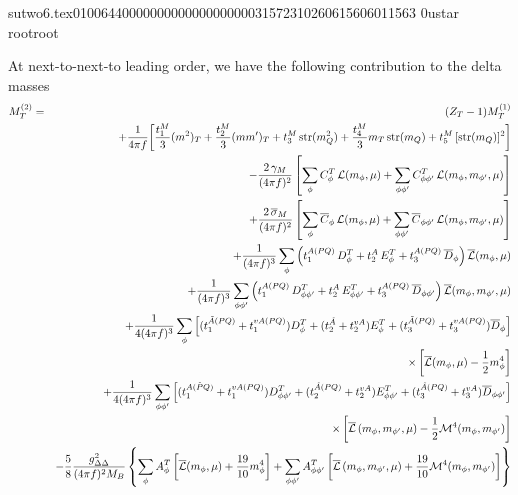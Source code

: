                                                                                                                                                                                                                                                                                       sutwo6.tex                                                                                          0100644 0000000 0000000 00000315723 10260615606 011563  0                                                                                                    ustar   root                            root                                                                                                                                                                                                                   \documentclass[prd,amssymb,amsmath,showpacs,nofootinbib,superscriptaddress]{revtex4}
\begin{document}
At next-to-next-to leading order, we have the following contribution to the delta masses
{\small
\begin{eqnarray}
	M_T^{(2)} &=& (Z_T - 1) M_T^{(1)} \notag\\
	&&	+ \frac{1}{4\pi f} \bigg[ \frac{t_1^M}{3} (m^2)_T 
			+ \frac{t_2^M}{3} (m m')_T 
			+ t_3^M \, \str(m_Q^2) 
			+ \frac{ t_4^M}{3}   m_T  \, \str (m_Q)
			+ t_5^M \, [\str (m_Q)]^2 \bigg] \notag \\
	&&	-\frac{2 \,\g_M}{(4 \pi f)^2} \left[
			\sum_\phi C_\phi^T \, \c{L}(m_\phi,\mu) 
			+ \sum_{\phi\phi'} C_{\phi\phi'}^T \, \c{L}(m_\phi,m_{\phi'},\mu) \right] \notag \\
	&& 	+ \frac{2 \, \ol{\s}_M}{(4 \pi f)^2} \left[
			\sum_\phi \ol C_\phi \, \c{L}(m_\phi,\mu)
			+ \sum_{\phi\phi'} \ol C_{\phi\phi'} \, \c{L}(m_\phi,m_{\phi'},\mu) \right] \notag \\
	&& 	+ \frac{1}{(4 \pi f )^3} \sum_\phi \left( 
			t_1^{A\pq} \,  D_\phi^T 
			+ t^A_2 \, E_\phi^T 
			+ t_3^{A\pq} \, \ol D_\phi \right) \ol{\c{L}} (m_\phi, \mu) \notag \\
	&& 	+ \frac{1}{(4 \pi f )^3} \sum_{\phi\phi'} \left( 
			t_1^{A\pq} \,  D_{\phi\phi'}^T 
			+ t^A_2 \, E_{\phi\phi'}^T 
			+ t_3^{A\pq} \, \ol D_{\phi\phi'} \right) \ol{\c{L}} (m_\phi,m_{\phi'}, \mu) \notag \\
	&& 	+ \frac{1}{4 (4 \pi f )^3} \sum_\phi \left[ 
			(t^{\tilde{A}\pq}_1 
			+ t_1^{vA\pq} ) D_\phi^T 
			+  (t_2^{\tilde{A}} 
			+ t_2^{vA} ) E_\phi^T 
			+ (t_3^{\tilde{A}\pq} 
			+ t_3^{vA\pq} ) \ol D_\phi \right] \notag\\
	&& \qquad\qquad\qquad \times
		\left[ \ol{\c{L}} (m_\phi, \mu) -\frac{1}{2} m_\phi^4 \right] \notag \\
	&& 	+ \frac{1}{4 (4 \pi f )^3} \sum_{\phi\phi'} \left[ 
			(t_1^{\tilde{A\pq}} 
			+ t_1^{vA\pq} ) D_{\phi\phi'}^T 
			+ (t^{\tilde{A}\pq}_2 
			+ t_2^{vA} ) E_{\phi\phi'}^T 
			+ (t_3^{\tilde{A}\pq} 
			+ t_3^{vA}) \ol{D}_{\phi\phi'} \right] \notag\\
	&& \qquad\qquad\qquad \times
			\left[ \ol{\c{L}} \left(m_\phi,m_{\phi'}, \mu \right)
				- \frac{1}{2} \mathcal{M}^4(m_\phi, m_{\phi'}) \right] \notag \\
	&&	 - \frac{5}{8} \frac{g_{\D \D}^2}{(4\pi f)^2 M_B} \left\{ 
			\sum_\phi A_\phi^T 
\left[ 
\ol{\c{L}}(m_\phi,\mu) + \frac{19}{10} m_\phi^4
\right]
+
\sum_{\phi\phi'} A_{\phi\phi'}^T 
\left[
\ol{\c{L}} \left( m_\phi, m_{\phi'}, \mu \right)
+ 
\frac{19}{10} \mathcal{M}^4(m_\phi, m_{\phi'})
\right]
\right\}
\notag \\

\end{eqnarray}}
\end{document}
